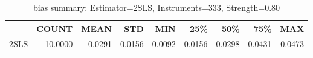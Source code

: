 \begin{table}[ht]
\centering
\caption{bias summary: Estimator=2SLS, Instruments=333, Strength=0.80}
\begin{tabular}{lrrrrrrrr}
\toprule
 & COUNT & MEAN & STD & MIN & 25\% & 50\% & 75\% & MAX \\
\midrule
2SLS & 10.0000 & 0.0291 & 0.0156 & 0.0092 & 0.0156 & 0.0298 & 0.0431 & 0.0473 \\
\bottomrule
\end{tabular}
\end{table}
